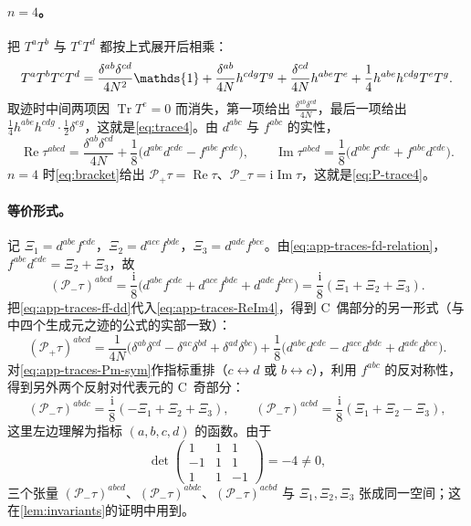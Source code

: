 \documentclass[UTF8,a4paper,11pt,fontset=fandol]{ctexart}
\let\amsmathbb\mathbb
\renewcommand{\mathbb}[1]{\ifx1#1\mathds{1}\else\amsmathbb{#1}\fi}
\theoremstyle{cplain}
\theoremstyle{cdefinition}
\theoremstyle{cremark}
\numberwithin{equation}{section}
\DeclareMathOperator{\Tr}{Tr}
\DeclareMathOperator{\Real}{Re}
\DeclareMathOperator{\Imag}{Im}
\newcommand{\Pp}{\mathcal{P}_{+}}                    %
\newcommand{\Pm}{\mathcal{P}_{-}}                    %
\newcommand{\ii}{\mathrm{i}}                        %
\begin{document}
\paragraph{$n=4$。}把 $T^aT^b$ 与 $T^cT^d$ 都按上式展开后相乘：
\[
T^aT^bT^cT^d=\frac{\delta^{ab}\delta^{cd}}{4N^2}\mathbb 1+\frac{\delta^{ab}}{4N}h^{cdg}T^g+\frac{\delta^{cd}}{4N}h^{abe}T^e+\frac14h^{abe}h^{cdg}T^eT^g .
\]
取迹时中间两项因 $\Tr T^e=0$ 而消失，第一项给出 $\frac{\delta^{ab}\delta^{cd}}{4N}$，最后一项给出 $\frac14h^{abe}h^{cdg}\cdot\frac12\delta^{eg}$，这就是\cref{eq:trace4}。由 $d^{abc}$ 与 $f^{abc}$ 的实性，
\begin{equation}\label{eq:app-traces-ReIm4}
\Real\tau^{abcd}=\frac{\delta^{ab}\delta^{cd}}{4N}+\frac18\bigl(d^{abe}d^{cde}-f^{abe}f^{cde}\bigr),\qquad
\Imag\tau^{abcd}=\frac18\bigl(d^{abe}f^{cde}+f^{abe}d^{cde}\bigr).
\end{equation}
$n=4$ 时\cref{eq:bracket}给出 $\Pp\tau=\Real\tau$、$\Pm\tau=\ii\Imag\tau$，这就是\cref{eq:P-trace4}。

\paragraph{等价形式。}记 $\Xi_1=d^{abe}f^{cde}$，$\Xi_2=d^{ace}f^{bde}$，$\Xi_3=d^{ade}f^{bce}$。由\cref{eq:app-traces-fd-relation}，$f^{abe}d^{cde}=\Xi_2+\Xi_3$，故
\begin{equation}\label{eq:app-traces-Pm-sym}
(\Pm\tau)^{abcd}=\frac{\ii}8\bigl(d^{abe}f^{cde}+d^{ace}f^{bde}+d^{ade}f^{bce}\bigr)=\frac{\ii}{8}(\Xi_1+\Xi_2+\Xi_3).
\end{equation}
把\cref{eq:app-traces-ff-dd}代入\cref{eq:app-traces-ReIm4}，得到 C~偶部分的另一形式（与\cite{Haber2021}中四个生成元之迹的公式的实部一致）：
\begin{equation}\label{eq:app-traces-Pp-haber}
(\Pp\tau)^{abcd}=\frac1{4N}\bigl(\delta^{ab}\delta^{cd}-\delta^{ac}\delta^{bd}+\delta^{ad}\delta^{bc}\bigr)+\frac18\bigl(d^{abe}d^{cde}-d^{ace}d^{bde}+d^{ade}d^{bce}\bigr).
\end{equation}
对\cref{eq:app-traces-Pm-sym}作指标重排（$c\leftrightarrow d$ 或 $b\leftrightarrow c$），利用 $f^{abc}$ 的反对称性，得到另外两个反射对代表元的 C~奇部分：
\begin{equation}\label{eq:app-traces-Pm-three}
(\Pm\tau)^{abdc}=\frac{\ii}8(-\Xi_1+\Xi_2+\Xi_3),\qquad(\Pm\tau)^{acbd}=\frac{\ii}8(\Xi_1+\Xi_2-\Xi_3),
\end{equation}
这里左边理解为指标 $(a,b,c,d)$ 的函数。由于
\[
\det\begin{pmatrix}1&1&1\\-1&1&1\\1&1&-1\end{pmatrix}=-4\neq0,
\]
三个张量 $(\Pm\tau)^{abcd}$、$(\Pm\tau)^{abdc}$、$(\Pm\tau)^{acbd}$ 与 $\Xi_1,\Xi_2,\Xi_3$ 张成同一空间；这在\cref{lem:invariants}的证明中用到。
\end{document}
